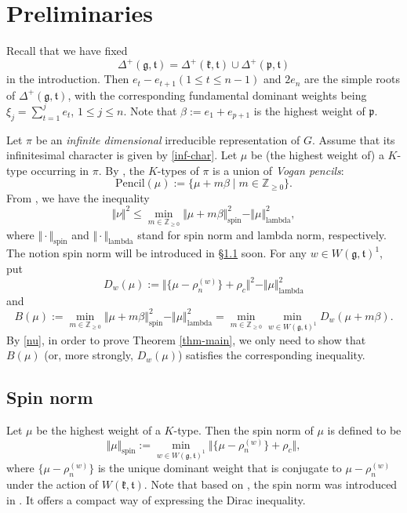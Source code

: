 \documentclass[11pt]{amsart}
\theoremstyle{plain}
\theoremstyle{definition}
\newcommand{\frg}{\mathfrak{g}}
\newcommand{\mfg}{\mathfrak{g}}
\newcommand{\frk}{\mathfrak{k}}
\newcommand{\frp}{\mathfrak{p}}
\newcommand{\frt}{\mathfrak{t}}
\newcommand{\mft}{\mathfrak{t}}
\newcommand{\bbZ}{\mathbb{Z}}
\begin{document}
\section{Preliminaries}\label{sec-pre}
Recall that we have fixed
$$
\Delta^+(\frg, \frt)=\Delta^+(\frk, \frt) \cup \Delta^+(\frp, \frt)
$$
in the introduction. Then $e_t-e_{t+1}(1\le t\le n-1)$ and $2e_n$ are the simple roots of $\Delta^+(\frg,\frt)$, with the corresponding fundamental dominant weights being $\xi_j=\sum_{t=1}^j e_t$, $1\le j\le n$. Note that $\beta:=e_1+e_{p+1}$ is the highest weight of $\frp$.



Let $\pi$ be an \emph{infinite dimensional} irreducible representation of $G$. Assume that its infinitesimal character is given by \eqref{inf-char}. Let $\mu$ be (the highest weight of) a $K$-type occurring in $\pi$. By \cite{V80},  the $K$-types of $\pi$ is a union of \emph{Vogan pencils}:
\begin{equation}
	\mathrm{Pencil}(\mu):=\{\mu+m\beta\mid m\in \bbZ_{\ge 0}\}.
\end{equation}
From \cite{D13},  we have the inequality
\begin{equation}\label{nu}
	\Vert \nu\Vert^2\le \min_{m\in\bbZ_{\ge 0}}\Vert \mu+m\beta\Vert_{\mathrm{spin}}^2-\Vert\mu\Vert_{\mathrm{lambda}}^2,
\end{equation}
where $\Vert\cdot\Vert_{\mathrm{spin}}$ and $\Vert\cdot\Vert_{\mathrm{lambda}}$ stand for spin norm and lambda norm, respectively. The notion spin norm will be introduced in \S\ref{sec-spin-norm} soon. For any $w\in W(\mfg,\mft)^1$, put
\begin{equation}\label{D-w-mu}
D_w(\mu):=\Vert\{\mu-\rho_n^{(w)}\}+\rho_c \Vert^2-\Vert\mu\Vert_{\mathrm{lambda}}^2
\end{equation}
and
\begin{equation}\label{B-mu}
B(\mu):=\min_{m\in\bbZ_{\ge 0}}\Vert \mu+m\beta\Vert_{\mathrm{spin}}^2-\Vert\mu\Vert_{\mathrm{lambda}}^2=\min_{m\in\bbZ_{\ge 0}}\min_{w\in W(\mfg,\mft)^1}D_w(\mu+m\beta).
\end{equation}
By \eqref{nu}, in order to prove Theorem \ref{thm-main}, we only need to show that $B(\mu)$ (or, more strongly, $D_w(\mu)$) satisfies the corresponding inequality.



\subsection{Spin norm}\label{sec-spin-norm}
Let $\mu$ be the highest weight of a $K$-type. Then the spin norm of $\mu$ is defined to be
 \begin{equation}\label{spin}
 	\Vert\mu\Vert_{\mathrm{spin}}:=\min_{w\in W(\frg,\frt)^1}\Vert \{\mu-\rho_n^{(w)}\}+\rho_c\Vert,
 \end{equation}
 where $\{\mu-\rho_n^{(w)}\}$ is the unique dominant weight that is conjugate to $\mu-\rho_n^{(w)}$ under the action of $W(\frk,\frt)$. Note that based on \cite{HP}, the spin norm was introduced in \cite{D13}. It offers a compact way of expressing the Dirac inequality.
\end{document}
